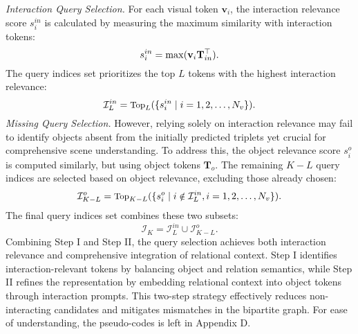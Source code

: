 \textit{Interaction Query Selection.} For each visual token $\mathbf{v}_i$, the interaction relevance score $s_i^{in}$ is calculated by measuring the maximum similarity with interaction tokens:
\begin{equation}
\small
\label{eq:step2}
    s_i^{in} = \max (\mathbf{v}_i \mathbf{T}_{in}^\top).
\end{equation}
 The query indices set prioritizes the top $L$ tokens with the highest interaction relevance:
\begin{equation}
\small
    \mathcal{I}_L^{in} = \text{Top}_L ( \{ s_i^{in} \mid i = 1, 2, \dots, N_v \} ).
\end{equation}
\textit{Missing Query Selection.} However, relying solely on interaction relevance may fail to identify objects absent from the initially predicted triplets yet crucial for comprehensive scene understanding. To address this, the object relevance score $s_i^{o}$ is computed similarly, but using object tokens $\mathbf{T}_{o}$. The remaining $K-L$ query indices are selected based on object relevance, excluding those already chosen:
\begin{equation}
\small
    \mathcal{I}_{K-L}^{o} = \text{Top}_{K-L} (\{ s_i^o \mid i \notin \mathcal{I}_L^{in}, i = 1, 2, \dots, N_v \} ).
\end{equation}
The final query indices set combines these two subsets:
\begin{equation}
\mathcal{I}_K = \mathcal{I}_L^{in} \cup \mathcal{I}_{K-L}^{o}. \end{equation}
Combining Step I and Step II, the query selection achieves both interaction relevance and comprehensive integration of relational context. Step I identifies interaction-relevant tokens by balancing object and relation semantics, while Step II refines the representation by embedding relational context into object tokens through interaction prompts. This two-step strategy effectively reduces non-interacting candidates and mitigates mismatches in the bipartite graph. For ease of understanding, the pseudo-codes is left in Appendix D.




